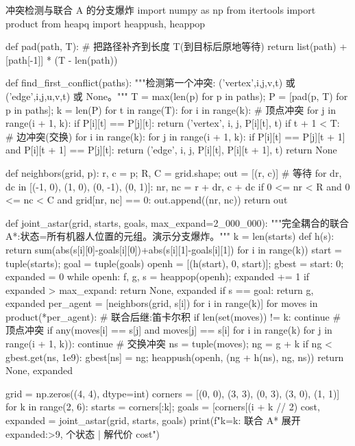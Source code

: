 \begin{codebox}[Python]{冲突检测与联合 A\* 的分支爆炸}
import numpy as np
from itertools import product
from heapq import heappush, heappop

def pad(path, T):                                   # 把路径补齐到长度 T(到目标后原地等待)
    return list(path) + [path[-1]] * (T - len(path))

def find_first_conflict(paths):
    """检测第一个冲突: ('vertex',i,j,v,t) 或 ('edge',i,j,u,v,t) 或 None。"""
    T = max(len(p) for p in paths); P = [pad(p, T) for p in paths]; k = len(P)
    for t in range(T):
        for i in range(k):                          # 顶点冲突
            for j in range(i + 1, k):
                if P[i][t] == P[j][t]: return ('vertex', i, j, P[i][t], t)
        if t + 1 < T:                               # 边冲突(交换)
            for i in range(k):
                for j in range(i + 1, k):
                    if P[i][t] == P[j][t + 1] and P[i][t + 1] == P[j][t]:
                        return ('edge', i, j, P[i][t], P[i][t + 1], t)
    return None

def neighbors(grid, p):
    r, c = p; R, C = grid.shape; out = [(r, c)]     # 等待
    for dr, dc in [(-1, 0), (1, 0), (0, -1), (0, 1)]:
        nr, nc = r + dr, c + dc
        if 0 <= nr < R and 0 <= nc < C and grid[nr, nc] == 0: out.append((nr, nc))
    return out

def joint_astar(grid, starts, goals, max_expand=2_000_000):
    """完全耦合的联合 A*:状态=所有机器人位置的元组。演示分支爆炸。"""
    k = len(starts)
    def h(s): return sum(abs(s[i][0]-goals[i][0])+abs(s[i][1]-goals[i][1]) for i in range(k))
    start = tuple(starts); goal = tuple(goals)
    openh = [(h(start), 0, start)]; gbest = {start: 0}; expanded = 0
    while openh:
        f, g, s = heappop(openh); expanded += 1
        if expanded > max_expand: return None, expanded
        if s == goal: return g, expanded
        per_agent = [neighbors(grid, s[i]) for i in range(k)]
        for moves in product(*per_agent):           # 联合后继:笛卡尔积
            if len(set(moves)) != k: continue       # 顶点冲突
            if any(moves[i] == s[j] and moves[j] == s[i]
                   for i in range(k) for j in range(i + 1, k)): continue   # 交换冲突
            ns = tuple(moves); ng = g + k
            if ng < gbest.get(ns, 1e9):
                gbest[ns] = ng; heappush(openh, (ng + h(ns), ng, ns))
    return None, expanded

grid = np.zeros((4, 4), dtype=int)
corners = [(0, 0), (3, 3), (0, 3), (3, 0), (1, 1)]
for k in range(2, 6):
    starts = corners[:k]; goals = [corners[(i + k // 2) %
    cost, expanded = joint_astar(grid, starts, goals)
    print(f"k={k}: 联合 A* 展开 {expanded:>9,} 个状态 | 解代价 {cost}")
\end{codebox}

